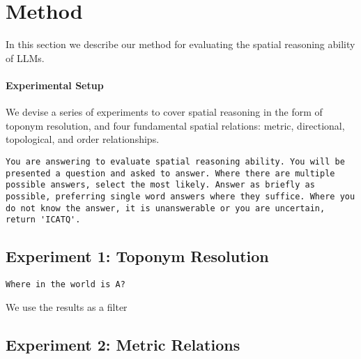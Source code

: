 \section{Method}
\label{section:method}

In this section we describe our method for evaluating the spatial reasoning ability of LLMs.


\paragraph{Experimental Setup}
We devise a series of experiments to cover spatial reasoning in the form of toponym resolution, and four fundamental spatial relations: metric, directional, topological, and order relationships.




\begin{lstlisting}[title=Initial System Prompt]
    You are answering to evaluate spatial reasoning ability. You will be presented a question and asked to answer. Where there are multiple possible answers, select the most likely. Answer as briefly as possible, preferring single word answers where they suffice. Where you do not know the answer, it is unanswerable or you are uncertain, return 'ICATQ'.
\end{lstlisting}




\subsection{Experiment 1: Toponym Resolution}


\begin{lstlisting}[title=Toponym Resolution Prompt]
    Where in the world is A?
\end{lstlisting}

We use the results as a filter



\subsection{Experiment 2: Metric Relations}

